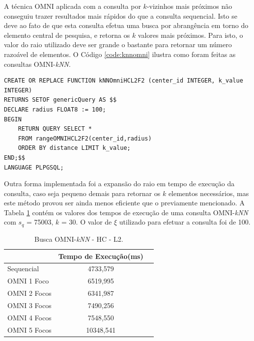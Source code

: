 A técnica OMNI aplicada com a consulta por $k$-vizinhos mais próximos não conseguiu trazer resultados mais rápidos do que a
consulta sequencial. Isto se deve ao fato de que esta consulta efetua uma busca por abrangência em torno do elemento central de pesquisa, e 
retorna os $k$ valores mais próximos. Para isto, o valor do raio utilizado deve ser grande o bastante para retornar um número razoável
de elementos. O Código \ref{code:knnomni} ilustra como foram feitas as consultas OMNI-\textit{kNN}.
\begin{minipage}{\textwidth}
\begin{lstlisting}[caption={kNN-OMNI utilizando 2 focos para a base HC}, captionpos=t, basicstyle=\tiny, label=code:knnomni]
CREATE OR REPLACE FUNCTION kNNOmniHCL2F2 (center_id INTEGER, k_value INTEGER) 
RETURNS SETOF genericQuery AS $$
DECLARE radius FLOAT8 := 100;
BEGIN
	RETURN QUERY SELECT * 
	FROM rangeOMNIHCL2F2(center_id,radius) 
	ORDER BY distance LIMIT k_value;		
END;$$
LANGUAGE PLPGSQL; 
\end{lstlisting}
\vspace{2cm}
\end{minipage}

Outra forma implementada foi a expansão do raio em tempo de execução da consulta, caso seja pequeno demais para retornar
os $k$ elementos necessários, mas este método provou ser ainda menos eficiente que o previamente mencionado. A Tabela \ref{tab:knnHC}
contém os valores dos tempos de execução de uma consulta OMNI-\textit{kNN} com $s_q$ = 75003, $k$ = 30. O valor de $\xi$ utilizado para
efetuar a consulta foi de 100.


\begin{table}[H]
    \centering
    \caption[Busca OMNI-\textit{kNN} - HC- L2]{Busca OMNI-\textit{kNN} - HC - L2.
    \label{tab:knnHC}}
   \begin{tabular}{l c c }
        \toprule
            &Tempo de Execução(ms)\\
        \midrule
            Sequencial & 4733,579  \\
            OMNI 1 Foco & 6519,995  \\
            OMNI 2 Focos & 6341,987  \\
            OMNI 3 Focos & 7490,256 \\
            OMNI 4 Focos & 7548,550 \\
            OMNI 5 Focos & 10348,541 \\
        \bottomrule
    \end{tabular}
\end{table}

